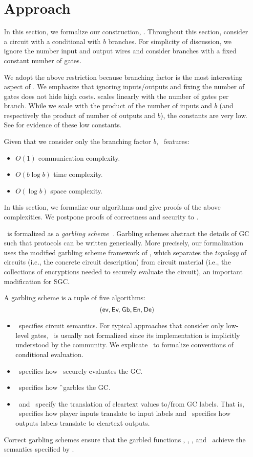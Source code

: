 \section{Approach}\label{sec:approach}
In this section, we formalize our construction, \ourschemelong.
Throughout this section, consider a circuit with a conditional with $b$
branches.
For simplicity of discussion, we ignore the number input and output
wires and consider branches with a fixed constant number of gates.

We adopt the above restriction because branching factor is the most interesting
aspect of \ourschemelong. We emphasize that ignoring inputs/outputs
and fixing the number of gates does not hide high costs.
\ourschemelong scales linearly with the number of gates per branch.
While we scale with the product of the number of inputs and $b$ (and
respectively the product of number of outputs and $b$), the
constants are very low.
See  for evidence of these low constants.

Given that we consider only the branching factor $b$, \ourschemelong\ features:
\begin{itemize}
  \item $O(1)$ communication complexity.
  \item $O(b \log b)$ time complexity.
  \item $O(\log b)$ space complexity.
\end{itemize}

In this section, we formalize our algorithms and give proofs of the above
complexities. We postpone proofs of correctness and security to
.

\ourschemelong\ is formalized as a \emph{garbling
scheme}~\cite{CCS:BelHoaRog12}.
Garbling schemes abstract the details of GC such that protocols can be written generically.
More precisely, our formalization uses the modified garbling scheme
framework of \HK, which separates the \emph{topology} of circuits
(i.e., the concrete circuit description) from circuit material
(i.e., the collections of encryptions needed to securely evaluate the
circuit), an important modification for SGC.

A garbling scheme is a tuple of five algorithms:
\[ (\textsf{ev}, \textsf{Ev}, \textsf{Gb}, \textsf{En}, \textsf{De}) \]
%
\begin{itemize}
  \item \gev\ specifies circuit semantics. For typical approaches that
    consider only low-level gates, \gev\ is usually not formalized since its
    implementation is implicitly understood by the community. We explicate \gev\ to formalize
    conventions of conditional evaluation.
  \item \gEv\ specifies how \E\ securely evaluates the GC.
  \item \gGb\ specifies how \G\ garbles the GC.
  \item \gEn\ and \gDe\ specify the translation of cleartext values
    to/from GC labels. That is, \gEn\ specifies how player
    inputs translate to input labels and \gDe\ specifies how outputs
    labels translate to cleartext outputs.
\end{itemize}
%
Correct garbling schemes ensure that the garbled functions \gGb, \gEn,
\gEv, and \gDe\ achieve the semantics specified by \gev.

